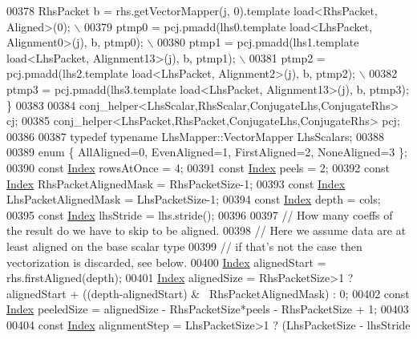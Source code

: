 \begin{DoxyCode}
{00378 \textcolor{preprocessor}{    RhsPacket b = rhs.getVectorMapper(j, 0).template load<RhsPacket, Aligned>(0);  \(\backslash\)}
00379 \textcolor{preprocessor}{    ptmp0 = pcj.pmadd(lhs0.template load<LhsPacket, Alignment0>(j), b, ptmp0); \(\backslash\)}
00380 \textcolor{preprocessor}{    ptmp1 = pcj.pmadd(lhs1.template load<LhsPacket, Alignment13>(j), b, ptmp1); \(\backslash\)}
00381 \textcolor{preprocessor}{    ptmp2 = pcj.pmadd(lhs2.template load<LhsPacket, Alignment2>(j), b, ptmp2); \(\backslash\)}
00382 \textcolor{preprocessor}{    ptmp3 = pcj.pmadd(lhs3.template load<LhsPacket, Alignment13>(j), b, ptmp3); \}}
00383 
00384   conj\_helper<LhsScalar,RhsScalar,ConjugateLhs,ConjugateRhs> cj;
00385   conj\_helper<LhsPacket,RhsPacket,ConjugateLhs,ConjugateRhs> pcj;
00386 
00387   \textcolor{keyword}{typedef} \textcolor{keyword}{typename} LhsMapper::VectorMapper LhsScalars;
00388 
00389   \textcolor{keyword}{enum} \{ AllAligned=0, EvenAligned=1, FirstAligned=2, NoneAligned=3 \};
00390   \textcolor{keyword}{const} \hyperlink{namespace_eigen_a62e77e0933482dafde8fe197d9a2cfde}{Index} rowsAtOnce = 4;
00391   \textcolor{keyword}{const} \hyperlink{namespace_eigen_a62e77e0933482dafde8fe197d9a2cfde}{Index} peels = 2;
00392   \textcolor{keyword}{const} \hyperlink{namespace_eigen_a62e77e0933482dafde8fe197d9a2cfde}{Index} RhsPacketAlignedMask = RhsPacketSize-1;
00393   \textcolor{keyword}{const} \hyperlink{namespace_eigen_a62e77e0933482dafde8fe197d9a2cfde}{Index} LhsPacketAlignedMask = LhsPacketSize-1;
00394   \textcolor{keyword}{const} \hyperlink{namespace_eigen_a62e77e0933482dafde8fe197d9a2cfde}{Index} depth = cols;
00395   \textcolor{keyword}{const} \hyperlink{namespace_eigen_a62e77e0933482dafde8fe197d9a2cfde}{Index} lhsStride = lhs.stride();
00396 
00397   \textcolor{comment}{// How many coeffs of the result do we have to skip to be aligned.}
00398   \textcolor{comment}{// Here we assume data are at least aligned on the base scalar type}
00399   \textcolor{comment}{// if that's not the case then vectorization is discarded, see below.}
00400   \hyperlink{namespace_eigen_a62e77e0933482dafde8fe197d9a2cfde}{Index} alignedStart = rhs.firstAligned(depth);
00401   \hyperlink{namespace_eigen_a62e77e0933482dafde8fe197d9a2cfde}{Index} alignedSize = RhsPacketSize>1 ? alignedStart + ((depth-alignedStart) & ~RhsPacketAlignedMask) 
      : 0;
00402   \textcolor{keyword}{const} \hyperlink{namespace_eigen_a62e77e0933482dafde8fe197d9a2cfde}{Index} peeledSize = alignedSize - RhsPacketSize*peels - RhsPacketSize + 1;
00403 
00404   \textcolor{keyword}{const} \hyperlink{namespace_eigen_a62e77e0933482dafde8fe197d9a2cfde}{Index} alignmentStep = LhsPacketSize>1 ? (LhsPacketSize - lhsStride %
}
\end{DoxyCode}
